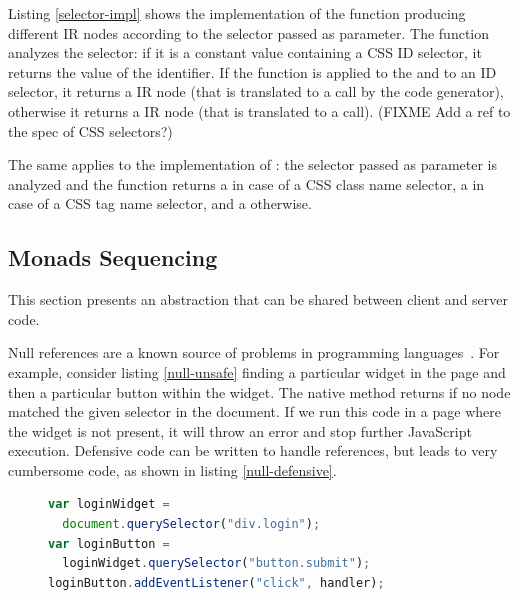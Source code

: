 \documentclass[preprint]{sigplanconf}
\begin{document}
Listing \ref{selector-impl} shows the implementation of the  function producing different
IR nodes according to the selector passed as parameter. The  function analyzes
the selector: if it is a constant  value containing a CSS ID selector, it returns the
value of the identifier. If the  function is applied to the  and to an ID
selector, it returns a  IR node (that is translated to a
 call by the code generator), otherwise it returns a
 IR node (that is translated to a  call). (FIXME Add a ref to
the spec of CSS selectors?)

The same applies to the implementation of : the selector passed as parameter is
analyzed and the function returns a  in case of a CSS class
name selector, a  in case of a CSS tag name selector, and a
 otherwise.


\subsection{Monads Sequencing}

This section presents an abstraction that can be shared between client and server code.

Null references are a known source of problems in programming
languages~\cite{Hoare09_Null,Nanda09_Null}. For example, consider listing \ref{null-unsafe} finding
a particular widget in the page and then a particular button within the widget. The native
 method returns  if no node matched the given selector in the
document. If we run this code in a page where the widget is not present, it will throw an error
and stop further JavaScript execution. Defensive code can be written to handle 
references, but leads to very cumbersome code, as shown in listing \ref{null-defensive}.

\begin{figure}
\begin{lstlisting}[language=JavaScript,label=null-unsafe,caption=Unsafe code,captionpos=b]
var loginWidget =
  document.querySelector("div.login");
var loginButton =
  loginWidget.querySelector("button.submit");
loginButton.addEventListener("click", handler);
\end{lstlisting}
\end{figure}
\end{document}
